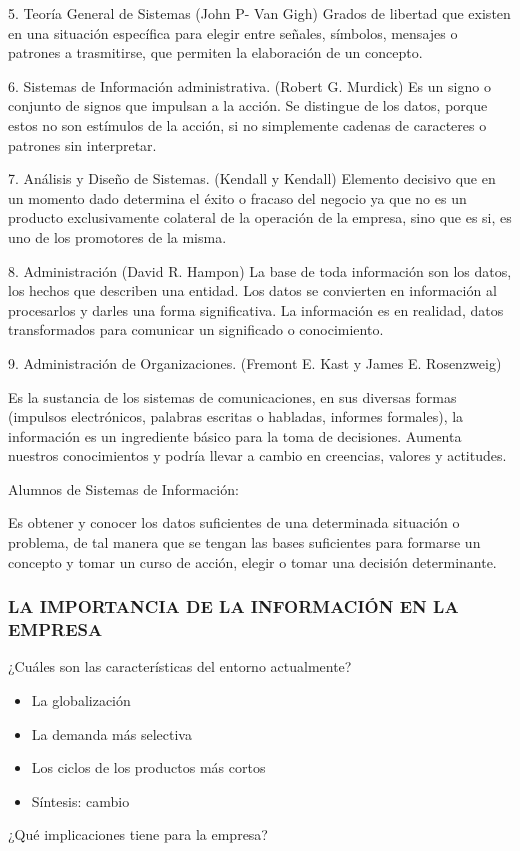 5. Teoría General de Sistemas (John P- Van Gigh) Grados de libertad que existen en una situación específica para elegir entre señales, símbolos, mensajes o patrones a trasmitirse, que permiten la elaboración de un concepto.

6. Sistemas de Información administrativa. (Robert G. Murdick) Es un signo o conjunto de signos que impulsan a la acción. Se distingue de los datos, porque estos no son estímulos de la acción, si no simplemente cadenas de caracteres o patrones sin interpretar.

7. Análisis y Diseño de Sistemas. (Kendall y Kendall) Elemento decisivo que en un momento dado determina el éxito o fracaso del negocio ya que no es un producto exclusivamente colateral de la operación de la empresa, sino que es si, es uno de los promotores de la misma.

8. Administración (David R. Hampon) La base de toda información son los datos, los hechos que describen una entidad. Los datos se convierten en información al procesarlos y darles una forma significativa. La información es en realidad, datos transformados para comunicar un significado o conocimiento.

9. Administración de Organizaciones. (Fremont E. Kast y James E. Rosenzweig)



Es la sustancia de los sistemas de comunicaciones, en sus diversas formas (impulsos electrónicos, palabras escritas o habladas, informes formales), la información es un ingrediente básico para la toma de decisiones. Aumenta nuestros conocimientos y podría llevar a cambio en creencias, valores y actitudes.

Alumnos de Sistemas de Información:

Es obtener y conocer los datos suficientes de una determinada situación o problema, de tal manera que se tengan las bases suficientes para formarse un concepto y tomar un curso de acción, elegir o tomar una decisión determinante.

\subsubsection*{LA IMPORTANCIA DE LA INFORMACIÓN EN LA EMPRESA}
¿Cuáles son las características del entorno actualmente?

\begin{itemize}
  \item La globalización
  \item La demanda más selectiva
  \item Los ciclos de los productos más cortos
  \item Síntesis: cambio
\end{itemize}
¿Qué implicaciones tiene para la empresa?

